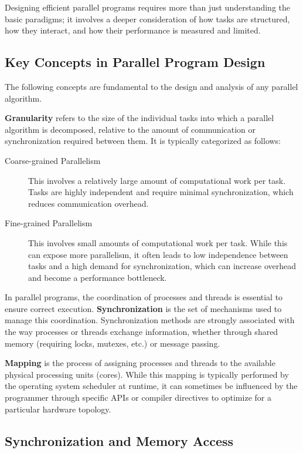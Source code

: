 Designing efficient parallel programs requires more than just understanding the basic paradigms; it involves a deeper consideration of how tasks are structured, how they interact, and how their performance is measured and limited.

\subsection{Key Concepts in Parallel Program Design}
The following concepts are fundamental to the design and analysis of any parallel algorithm.

\textbf{Granularity} refers to the size of the individual tasks into which a parallel algorithm is decomposed, relative to the amount of communication or synchronization required between them. It is typically categorized as follows:
\begin{description}
    \item[Coarse-grained Parallelism] This involves a relatively large amount of computational work per task. Tasks are highly independent and require minimal synchronization, which reduces communication overhead.
    \item[Fine-grained Parallelism] This involves small amounts of computational work per task. While this can expose more parallelism, it often leads to low independence between tasks and a high demand for synchronization, which can increase overhead and become a performance bottleneck.
\end{description}

In parallel programs, the coordination of processes and threads is essential to ensure correct execution. \textbf{Synchronization} is the set of mechanisms used to manage this coordination. Synchronization methods are strongly associated with the way processes or threads exchange information, whether through shared memory (requiring locks, mutexes, etc.) or message passing.

\textbf{Mapping} is the process of assigning processes and threads to the available physical processing units (cores). While this mapping is typically performed by the operating system scheduler at runtime, it can sometimes be influenced by the programmer through specific APIs or compiler directives to optimize for a particular hardware topology.

\subsection{Synchronization and Memory Access}

